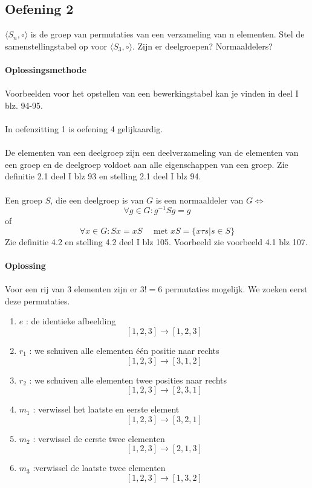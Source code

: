 \documentclass[11pt,a4paper,titlepage]{article}
\begin{document}
\subsection{Oefening 2}
 $\langle S_n, \circ \rangle$ is de groep van permutaties van een verzameling van n elementen. Stel de samenstellingstabel op voor $\langle S_3, \circ \rangle$. Zijn er deelgroepen? Normaaldelers?
\\ \\ \textbf{Oplossingsmethode} \\ \\
Voorbeelden voor het opstellen van een bewerkingstabel kan je vinden in deel I blz. 94-95. \\ \\
In oefenzitting 1 is oefening 4 gelijkaardig. \\ \\
De elementen van een deelgroep zijn een deelverzameling van de elementen van een groep en de deelgroep voldoet aan alle eigenschappen van een groep. Zie definitie 2.1 deel I blz 93 en stelling 2.1 deel I blz 94. \\ \\
Een groep $S$, die een deelgroep is van $G$ is een normaaldeler van $G \Leftrightarrow$
	$$\forall g \in G : g^{-1} Sg = g$$
of
	$$\forall x \in G : Sx = xS \quad  \text{ met } xS = \{x\tau s|s\in S\}$$
Zie definitie 4.2 en stelling 4.2 deel I blz 105. Voorbeeld zie voorbeeld 4.1 blz 107.
\\ \\ \textbf{Oplossing} \\ \\
Voor een rij van 3 elementen zijn er $3! = 6$ permutaties mogelijk. We zoeken eerst deze permutaties.
\begin{enumerate}
\item $e$ : de identieke afbeelding $$[1,2,3] \rightarrow [1,2,3]$$
\item $r_1$ : we schuiven alle elementen één positie naar rechts $$[1,2,3] \rightarrow [3,1,2]$$
\item $r_2$ : we schuiven alle elementen twee posities naar rechts $$[1,2,3] \rightarrow [2,3,1]$$
\item $m_1$ : verwissel het laatste en eerste element $$[1,2,3] \rightarrow [3,2,1]$$
\item $m_2$ : verwissel de eerste twee elementen $$[1,2,3] \rightarrow [2,1,3]$$
\item $m_3$ :verwissel de laatste twee elementen $$[1,2,3] \rightarrow [1,3,2]$$
\end{enumerate}
\end{document}
